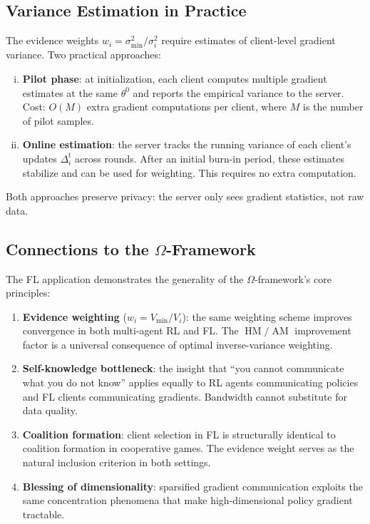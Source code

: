 \documentclass[11pt,a4paper]{article}
\DeclareMathOperator{\AM}{AM}
\DeclareMathOperator{\HM}{HM}
\begin{document}
\subsection{Variance Estimation in Practice}

The evidence weights $w_i = \sigma_{\min}^2 / \sigma_i^2$ require estimates
of client-level gradient variance. Two practical approaches:
\begin{enumerate}[(i)]
  \item \textbf{Pilot phase}: at initialization, each client computes
    multiple gradient estimates at the same $\theta^0$ and reports the
    empirical variance to the server. Cost: $O(M)$ extra gradient
    computations per client, where $M$ is the number of pilot samples.
  \item \textbf{Online estimation}: the server tracks the running variance
    of each client's updates $\Delta_i^t$ across rounds. After an initial
    burn-in period, these estimates stabilize and can be used for weighting.
    This requires no extra computation.
\end{enumerate}

Both approaches preserve privacy: the server only sees gradient statistics,
not raw data.

\subsection{Connections to the $\Omega$-Framework}

The FL application demonstrates the generality of the $\Omega$-framework's
core principles:
\begin{enumerate}[(1)]
  \item \textbf{Evidence weighting} ($w_i = V_{\min}/V_i$): the same
    weighting scheme improves convergence in both multi-agent RL and FL.
    The $\HM/\AM$ improvement factor is a universal consequence of optimal
    inverse-variance weighting.
  \item \textbf{Self-knowledge bottleneck}: the insight that ``you cannot
    communicate what you do not know'' applies equally to RL agents
    communicating policies and FL clients communicating gradients.
    Bandwidth cannot substitute for data quality.
  \item \textbf{Coalition formation}: client selection in FL is structurally
    identical to coalition formation in cooperative games. The evidence
    weight serves as the natural inclusion criterion in both settings.
  \item \textbf{Blessing of dimensionality}: sparsified gradient communication
    exploits the same concentration phenomena that make high-dimensional
    policy gradient tractable.
\end{enumerate}
\end{document}
